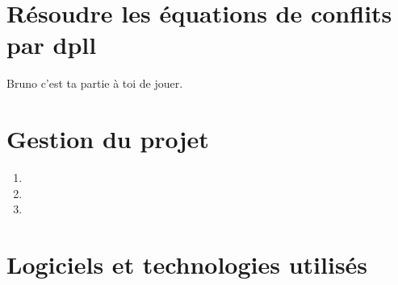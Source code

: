 \documentclass[16pts]{report}
\begin{document}

\section{Résoudre les équations de conflits par dpll}
\label{sec:Résoudre les équations de conflits par dpll}

Bruno c'est ta partie à toi de jouer.

\section{Gestion du projet}
\label{sec:Gestion du projet}

\begin{enumerate}
	\item 
	\item 
	\item 
\end{enumerate}

\section{Logiciels et technologies utilisés}
\label{sec:Logiciels et technologies utilisés}
\end{document}
